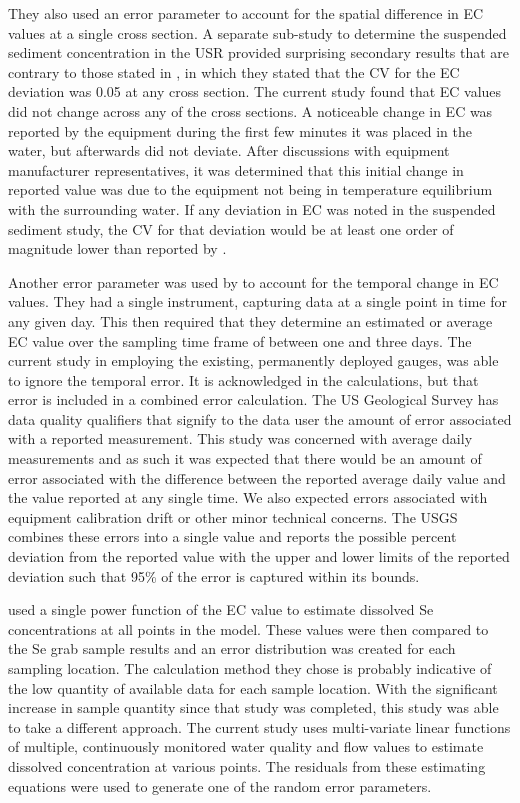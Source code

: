 They also used an error parameter to account for the spatial difference in EC values at a single cross section.  A separate sub-study to determine the suspended sediment concentration in the USR provided surprising secondary results that are contrary to those stated in \citeauthor{Mueller2008}, in which they stated that the CV for the EC deviation was 0.05 at any cross section.  The current study found that EC values did not change across any of the cross sections.  A noticeable change in EC was reported by the equipment during the first few minutes it was placed in the water, but afterwards did not deviate.  After discussions with equipment manufacturer representatives, it was determined that this initial change in reported value was due to the equipment not being in temperature equilibrium with the surrounding water.  If any deviation in EC was noted in the suspended sediment study, the CV for that deviation would be at least one order of magnitude lower than reported by \citeauthor{Mueller2008}.

Another error parameter was used by \citeauthor{Mueller2008} to account for the temporal change in EC values.  They had a single instrument, capturing data at a single point in time for any given day.  This then required that they determine an estimated or average EC value over the sampling time frame of between one and three days.  The current study in employing the existing, permanently deployed gauges, was able to ignore the temporal error.  It is acknowledged in the calculations, but that error is included in a combined error calculation.  The US Geological Survey has data quality qualifiers that signify to the data user the amount of error associated with a reported measurement.  This study was concerned with average daily measurements and as such it was expected that there would be an amount of error associated with the difference between the reported average daily value and the value reported at any single time.  We also expected errors associated with equipment calibration drift or other minor technical concerns.  The USGS combines these errors into a single value and reports the possible percent deviation from the reported value with the upper and lower limits of the reported deviation such that 95\% of the error is captured within its bounds.

\citeauthor{Mueller2008} used a single power function of the EC value to estimate dissolved Se concentrations at all points in the model.  These values were then compared to the Se grab sample results and an error distribution was created for each sampling location.  The calculation method they chose is probably indicative of the low quantity of available data for each sample location.  With the significant increase in sample quantity since that study was completed, this study was able to take a different approach.  The current study uses multi-variate linear functions of multiple, continuously monitored water quality and flow values to estimate dissolved concentration at various points.  The residuals from these estimating equations were used to generate one of the random error parameters.

